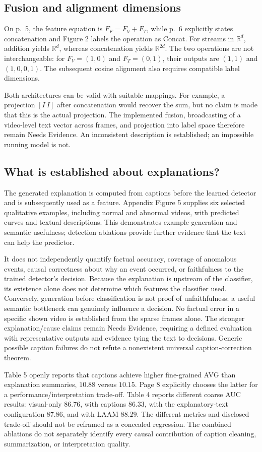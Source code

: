 \documentclass[10pt]{article}
\begin{document}
\subsection*{Fusion and alignment dimensions}
On p. 5, the feature equation is \(F_F=F_V+F_T\), while p. 6 explicitly states concatenation and Figure 2 labels the operation as Concat. For streams in \(\mathbb R^d\), addition yields \(\mathbb R^d\), whereas concatenation yields \(\mathbb R^{2d}\). The two operations are not interchangeable: for \(F_V=(1,0)\) and \(F_T=(0,1)\), their outputs are \((1,1)\) and \((1,0,0,1)\). The subsequent cosine alignment also requires compatible label dimensions.\par
Both architectures can be valid with suitable mappings. For example, a projection \([I\ I]\) after concatenation would recover the sum, but no claim is made that this is the actual projection. The implemented fusion, broadcasting of a video-level text vector across frames, and projection into label space therefore remain Needs Evidence. An inconsistent description is established; an impossible running model is not.\par
\subsection*{What is established about explanations?}
The generated explanation is computed from captions before the learned detector and is subsequently used as a feature. Appendix Figure 5 supplies six selected qualitative examples, including normal and abnormal videos, with predicted curves and textual descriptions. This demonstrates example generation and semantic usefulness; detection ablations provide further evidence that the text can help the predictor.\par
It does not independently quantify factual accuracy, coverage of anomalous events, causal correctness about why an event occurred, or faithfulness to the trained detector’s decision. Because the explanation is upstream of the classifier, its existence alone does not determine which features the classifier used. Conversely, generation before classification is not proof of unfaithfulness: a useful semantic bottleneck can genuinely influence a decision. No factual error in a specific shown video is established from the sparse frames alone. The stronger explanation/cause claims remain Needs Evidence, requiring a defined evaluation with representative outputs and evidence tying the text to decisions. Generic possible caption failures do not refute a nonexistent universal caption-correction theorem.\par
Table 5 openly reports that captions achieve higher fine-grained AVG than explanation summaries, \(10.88\) versus \(10.15\). Page 8 explicitly chooses the latter for a performance/interpretation trade-off. Table 4 reports different coarse AUC results: visual-only \(86.76\), with captions \(86.33\), with the explanatory-text configuration \(87.86\), and with LAAM \(88.29\). The different metrics and disclosed trade-off should not be reframed as a concealed regression. The combined ablations do not separately identify every causal contribution of caption cleaning, summarization, or interpretation quality.\par
\end{document}
